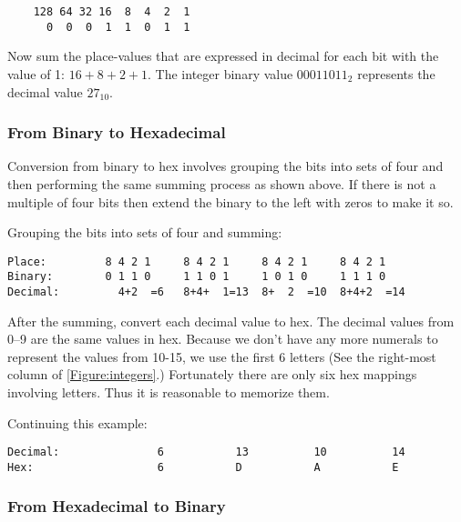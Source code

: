 \begin{verbatim}
    128 64 32 16  8  4  2  1
      0  0  0  1  1  0  1  1
\end{verbatim}

Now sum the place-values that are expressed in decimal for each 
bit with the value of 1: $16+8+2+1$.  The integer binary value
$00011011_2$ represents the decimal value $27_{10}$.

\subsubsection{From Binary to Hexadecimal}
\label{section:binhex}

Conversion from binary to hex involves grouping the bits into
sets of four and then performing the same summing process as 
shown above.  If there is not a multiple of four bits then
extend the binary to the left with zeros to make it so.

Grouping the bits into sets of four and summing:

\begin{verbatim}
Place:         8 4 2 1     8 4 2 1     8 4 2 1     8 4 2 1
Binary:        0 1 1 0     1 1 0 1     1 0 1 0     1 1 1 0
Decimal:         4+2  =6   8+4+  1=13  8+  2  =10  8+4+2  =14
\end{verbatim}

After the summing, convert each decimal value to hex.  The decimal
values from 0--9 are the same values in hex.  Because we don't have any
more numerals to represent the values from 10-15, we use the first 6
letters (See the right-most column of \autoref{Figure:integers}.)
Fortunately there are only six hex mappings involving letters.  Thus 
it is reasonable to memorize them.

Continuing this example:

\begin{verbatim}
Decimal:               6           13          10          14
Hex:                   6           D           A           E
\end{verbatim}



\subsubsection{From Hexadecimal to Binary}

